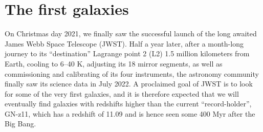 \documentclass[useAMS,usenatbib,bibyear]{aa}
\begin{document}

\section{The first galaxies}
\label{sec:jwst}

On Christmas day 2021, we finally saw the successful launch of the long awaited James Webb Space Telescope (JWST).
Half a year later, after a month-long journey to its ``destination'' Lagrange point 2 (L2) 1.5 million kilometers from Earth, cooling to 6--40 K, adjusting its 18 mirror segments, as well as commissioning and calibrating of its four instruments, the astronomy community finally saw its science data in July 2022.
A proclaimed goal of JWST is to look for some of the very first galaxies, and it is therefore expected that we will eventually find galaxies with redshifts higher than the current ``record-holder'', GN-z11, which has a redshift of 11.09 \citep{Oesch2016} and is hence seen some 400 Myr after the Big Bang.
\end{document}

